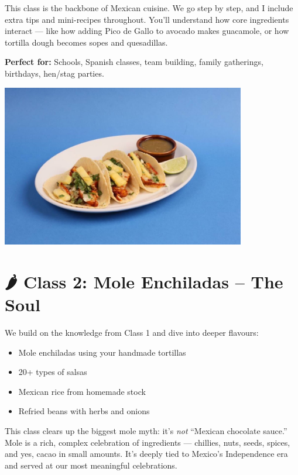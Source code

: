 \documentclass[12pt]{article}
\begin{document}
This class is the backbone of Mexican cuisine. We go step by step, and I include extra tips and mini-recipes throughout. You'll understand how core ingredients interact — like how adding Pico de Gallo to avocado makes guacamole, or how tortilla dough becomes sopes and quesadillas.

\textbf{Perfect for:} Schools, Spanish classes, team building, family gatherings, birthdays, hen/stag parties.

\vspace{1em}
\begin{center}
\includegraphics[width=0.8\textwidth]{assets/images/pastor_tacos.JPG}
\end{center}

\section*{🌶️ Class 2: Mole Enchiladas – The Soul}

We build on the knowledge from Class 1 and dive into deeper flavours:
\begin{itemize}
\item Mole enchiladas using your handmade tortillas
\item 20+ types of salsas
\item Mexican rice from homemade stock
\item Refried beans with herbs and onions
\end{itemize}

This class clears up the biggest mole myth: it’s \emph{not} “Mexican chocolate sauce.” Mole is a rich, complex celebration of ingredients — chillies, nuts, seeds, spices, and yes, cacao in small amounts. It’s deeply tied to Mexico’s Independence era and served at our most meaningful celebrations.

\vspace{1em}
\end{document}
